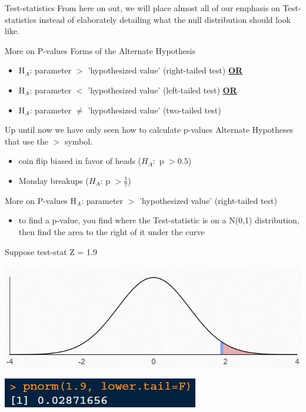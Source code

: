 \documentclass{beamer}
\begin{document}
\begin{frame}{Test-statistics}
From here on out, we will place almost all of our emphasis on Test-statistics instead of elaborately detailing what the null distribution should look like.
\end{frame}

\begin{frame}{More on P-values}
Forms of the Alternate Hypothesis
\begin{itemize}
    \item H$_A$: parameter $>$ 'hypothesized value' (right-tailed test) \textbf{\underline{OR}}
    \item H$_A$: parameter $<$ 'hypothesized value' (left-tailed test) \textbf{\underline{OR}}
    \item H$_A$: parameter $\neq$ 'hypothesized value' (two-tailed test)
\end{itemize} \vspace{6mm}

Up until now we have only seen how to calculate p-values Alternate Hypotheses that use the $>$ symbol.
\begin{itemize}
    \item coin flip biased in favor of heads ($H_A:$ p $> 0.5$)
    \item Monday breakups ($H_A$: p $> \frac{1}{7}$)
\end{itemize}
    
\end{frame}

\begin{frame}{More on P-values}
H$_A$: parameter $>$ 'hypothesized value' (right-tailed test)
\begin{itemize}
    \item to find a p-value, you find where the Test-statistic is on a N(0,1) distribution, then find the area to the right of it under the curve
\end{itemize} \vspace{2mm}

Suppose test-stat Z = 1.9
\begin{center}
    \includegraphics[scale=.7]{img/standardnormal_pvalue1.jpg}
    
    \includegraphics[scale=1]{img/Rpval1.jpg}
\end{center}
\end{frame}
\end{document}
